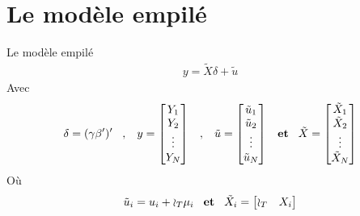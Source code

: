 \documentclass{beamer}
\begin{document}
\section{Le modèle empilé}
\frame{\tableofcontents[current]}
\begin{frame}{Le modèle empilé}
\begin{align*}
y=\tilde{X} \delta +\tilde{u}
\end{align*}
Avec 
\begin{align*}
\delta = (\gamma \beta')'
\hspace{0.3cm}, \hspace{0.3cm} 
y= \begin{bmatrix} 
Y_1 \\
Y_2 \\
\vdots \\
Y_N
\end{bmatrix}
\hspace{0.3cm}, \hspace{0.3cm} 
\tilde{u}= \begin{bmatrix} 
\tilde{u}_1 \\
\tilde{u}_2 \\
\vdots \\
\tilde{u}_N
\end{bmatrix}
\hspace{0.3cm}\textbf{et} \hspace{0.3cm} 
\tilde{X}= \begin{bmatrix} 
\tilde{X}_1 \\
\tilde{X}_2 \\
\vdots \\
\tilde{X}_N
\end{bmatrix}
\end{align*}
Où
\begin{align*}
\tilde{u}_i=u_i+\wr_T\mu_i \hspace{0.3cm}\textbf{et} \hspace{0.3cm}  \tilde{X}_i=\begin{bmatrix} 
\wr_T & X_i
\end{bmatrix}
\end{align*}
\end{frame}
\end{document}
